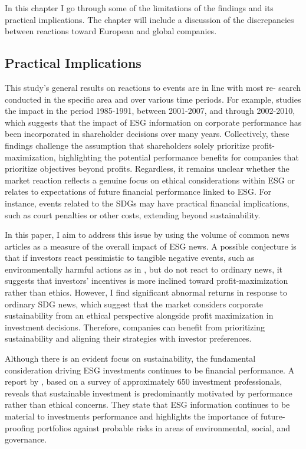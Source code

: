 
In this chapter I go through some of the limitations of the findings and its practical implications. The chapter will include a discussion of the discrepancies between reactions toward European and global companies. 

\subsection{Practical Implications} \label{sec: discussion_practical}

This study's general results on reactions to events are in line with most re-
search conducted in the specific area and over various time periods. For example, \cite{klassen1996impact} studies the impact in the period 1985-1991, \cite{kruger2015corporate} between 2001-2007, and \cite{Blancard_ESG_sentiment} through 2002-2010, which suggests that the impact of ESG information on corporate performance has been incorporated in shareholder decisions over many years. Collectively, these findings challenge the assumption that shareholders solely prioritize profit-maximization, highlighting the potential performance benefits for companies that prioritize objectives beyond profits. Regardless, it remains unclear whether the market reaction reflects a genuine focus on ethical considerations within ESG or relates to expectations of future financial performance linked to ESG. For instance, events related to the SDGs may have practical financial implications, such as court penalties or other costs, extending beyond sustainability. 

In this paper, I aim to address this issue by using the volume of common news articles as a measure of the overall impact of ESG news. A possible conjecture is that if investors react pessimistic to tangible negative events, such as environmentally harmful actions as in \cite{klassen1996impact}, but do not react to ordinary news, it suggests that investors' incentives is more inclined toward profit-maximization rather than ethics. However, I find significant abnormal returns in response to ordinary SDG news, which suggest that the market considers corporate sustainability from an ethical perspective alongside profit maximization in investment decisions. Therefore, companies can benefit from prioritizing sustainability and aligning their strategies with investor preferences. 

Although there is an evident focus on sustainability, the fundamental consideration driving ESG investments continues to be financial performance. A report by \cite{ESG_survey}, based on a survey of approximately 650 investment professionals, reveals that sustainable investment is predominantly motivated by performance rather than ethical concerns. They state that ESG information continues to be material to investments performance and highlights the importance of future-proofing portfolios against probable risks in areas of environmental, social, and governance. 

